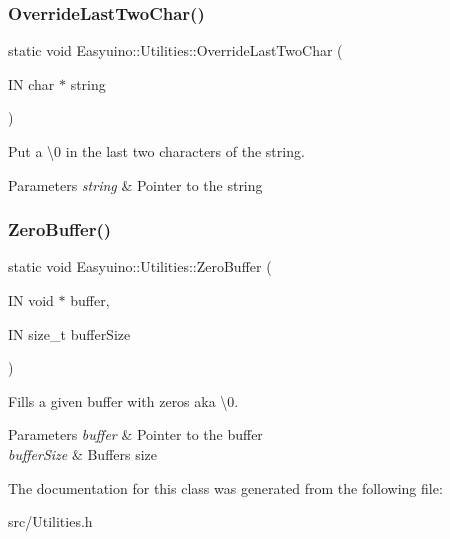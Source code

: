 \subsubsection{\texorpdfstring{Override\+Last\+Two\+Char()}{OverrideLastTwoChar()}}
{\footnotesize\ttfamily static void Easyuino\+::\+Utilities\+::\+Override\+Last\+Two\+Char (\begin{DoxyParamCaption}\item[{IN char $\ast$}]{string }\end{DoxyParamCaption})\hspace{0.3cm}{\ttfamily [static]}}



Put a \textbackslash{}0 in the last two characters of the string. 


\begin{DoxyParams}{Parameters}
{\em string} & Pointer to the string \\
\hline
\end{DoxyParams}
\mbox{\label{class_easyuino_1_1_utilities_a736bd038601132c4beac24cd88340695}} 
\subsubsection{\texorpdfstring{Zero\+Buffer()}{ZeroBuffer()}}
{\footnotesize\ttfamily static void Easyuino\+::\+Utilities\+::\+Zero\+Buffer (\begin{DoxyParamCaption}\item[{IN void $\ast$}]{buffer,  }\item[{IN size\+\_\+t}]{buffer\+Size }\end{DoxyParamCaption})\hspace{0.3cm}{\ttfamily [static]}}



Fills a given buffer with zeros aka \textbackslash{}0. 


\begin{DoxyParams}{Parameters}
{\em buffer} & Pointer to the buffer \\
\hline
{\em buffer\+Size} & Buffer\textquotesingle{}s size \\
\hline
\end{DoxyParams}


The documentation for this class was generated from the following file\+:\begin{DoxyCompactItemize}
\item 
src/Utilities.\+h\end{DoxyCompactItemize}
